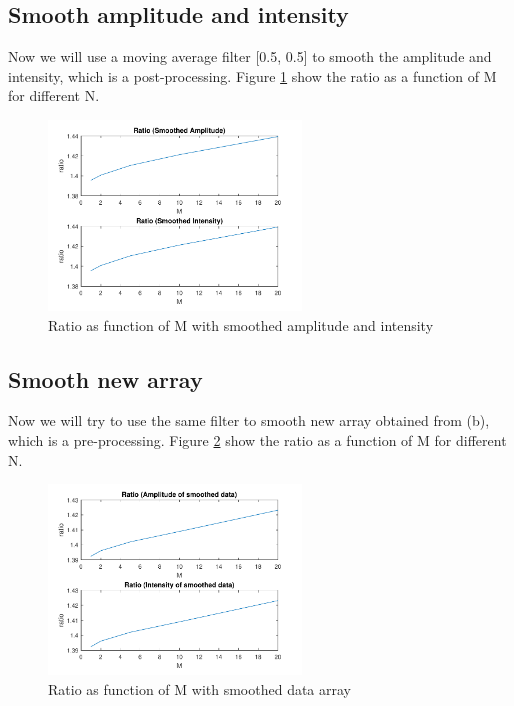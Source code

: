 \documentclass{article}
\begin{document}
\subsection{Smooth amplitude and intensity}
Now we will use a moving average filter [0.5, 0.5] to smooth the amplitude and intensity, which is a post-processing. 
Figure \ref{fig:ratio_smooth_later} show the ratio as a function of M for different N.
\begin{figure}[H]
	\centering
	\includegraphics[width = 0.6\textwidth]{src/2pi/ratio_smooth_later.pdf}
	\caption{Ratio as function of M with smoothed amplitude and intensity}
	\label{fig:ratio_smooth_later}
\end{figure}

\subsection{Smooth new array}
Now we will try to use the same filter to smooth new array obtained from (b), which is a pre-processing.
Figure \ref{fig:ratio_smooth_first} show the ratio as a function of M for different N.
\begin{figure}[H]
	\centering
	\includegraphics[width = 0.6\textwidth]{src/2pi/ratio_smooth_first.pdf}
	\caption{Ratio as function of M with smoothed data array}
	\label{fig:ratio_smooth_first}
\end{figure}
\end{document}
